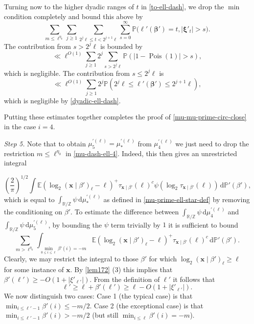 \documentclass[11pt,reqno]{amsart}
\numberwithin{equation}{section}
\theoremstyle{definition}
\theoremstyle{remark}
\newcommand{\mb}{\mathbb}
\newcommand{\mbf}{\mathbf}
\newcommand\Pois{\operatorname{Pois}}
\def\boldbeta{\boldsymbol\beta}
\def\boldxi{\boldsymbol\xi}
\renewcommand{\le}{\leqslant}
\renewcommand{\ge}{\geqslant}
\newcommand\Z{\mathbb{Z}}
\newcommand\R{\mathbb{R}}
\begin{document}
Turning now to the higher dyadic ranges of $t$ in \cref{to-ell-dash}, we drop the $\min$ condition completely and bound this above by
\[ \sum_{m \le \ell^{\eta_0}} \sum_{j \ge 1} \sum_{2^j \ell \le t < 2^{j+1} \ell} \sum_{s = 0}^{\infty} \mb{P} \big( \ell'(\boldbeta') = t, |\boldxi'_{t}| > s\big). \] The contribution from $s > 2^j\ell$ is bounded by
\[ \ll \ell^{O(1)} \sum_{j \ge 1} 2^j \sum_{s > 2^j \ell} \mb{P} (|1 - \Pois(1)| > s), \] which is negligible. The contribution from $s \le 2^j \ell$ is 
\[ \ll \ell^{O(1)} \sum_{j \ge 1} 2^j \mb{P}( 2^j\ell \le \ell'(\boldbeta') \le 2^{j + 1} \ell),\] which is negligible by \cref{dyadic-ell-dash}.

Putting these estimates together completes the proof of \cref{mu-mu-prime-circ-close} in the case $i = 4$.


\vspace*{10pt}

\emph{Step 5.} Note that to obtain $\mu^{\prime (\ell)}_5 = \mu_*^{\prime (\ell)}$ from $\mu^{\prime (\ell)}_4$ we just need to drop the restriction $m \le \ell^{\eta_0}$ in \cref{mu-dash-ell-4}. Indeed, this then gives an unrestricted integral

\[ (\frac{2}{\pi})^{1/2}\int \mb{E} (\log_2 (\mbf{x} \mid \beta')_{\ell} - \ell)^+ \tau_{\mbf{x} \mid \beta'}(\ell)^c \psi (\log_2 \tau_{\mbf{x} \mid \beta'}(\ell))\, \mathrm{d}\mb{P}'(\beta') ,\] which is equal to $\int_{\R/\Z} \psi \, \mathrm{d} \mu^{\prime (\ell)}_*$ as defined in \cref{mu-prime-ell-star-def} by removing the conditioning on $\beta'$.
To estimate the difference between $\int_{\R/\Z} \psi \, \mathrm{d}\mu_4^{\prime (\ell)}$ and $\int_{\R/\Z} \psi \, \mathrm{d}\mu_5^{\prime (\ell)}$, by bounding the $\psi$ term trivially by $1$ it is sufficient to bound
\begin{equation}\label{step-5-tobound} \sum_{m > \ell^{\eta_0}}\int_{\min_{0 \le i \le \ell} \beta'(i) = -m} \mb{E} (\log_2 (\mbf{x} \mid \beta')_{\ell} - \ell)^+ \tau_{\mbf{x} \mid \beta'}(\ell)^c \, \mathrm{d}\mb{P}'(\beta') . \end{equation}
Clearly, we may restrict the integral to those $\beta'$ for which $\log_2 (\mbf{x} \mid \beta')_{\ell} \ge \ell$ for some instance of $\mbf{x}$. By \cref{lem172} (3) this implies that $\beta'(\ell') \ge -O(1 + |\xi'_{\ell'}|)$. From the definition of $\ell'$ it follows that \begin{equation}\label{ell-dash-and-ell} \ell' \ge \ell + \beta'(\ell') \ge \ell - O(1 + |\xi'_{\ell'}|).\end{equation} We now distinguish two cases: Case 1 (the typical case) is that $\min_{i \le \ell'-1} \beta'(i) \le - m/2$. Case 2 (the exceptional case) is that $\min_{i \le \ell'-1} \beta'(i) > - m/2$ (but still $\min_{i \le \ell} \beta'(i) = -m$).\vspace*{8pt}
\end{document}
